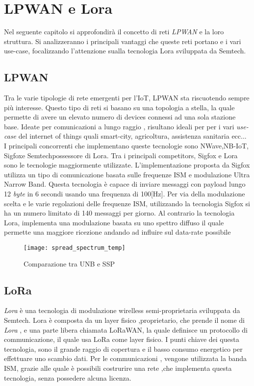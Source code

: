\chapter{LPWAN e Lora}
Nel seguente capitolo si approfondirà il concetto di reti \emph{LPWAN} e la loro 
struttura. Si analizzeranno i principali vantaggi che queste reti portano e i
vari use-case, focalizzando l'attenzione sualla tecnologia Lora sviluppata da
Semtech. 

\section{LPWAN}
Tra le varie tipologie di rete emergenti per l'IoT, LPWAN sta riscuotendo sempre
più interesse. Questo tipo di reti si basano su una topologia a stella, la quale
permette di avere un elevato numero di devices connessi ad una sola stazione
base. Ideate per comunicazioni a lungo raggio , risultano  ideali per 
per i vari \emph{use-case} del internet of things quali smart-city, agricoltura,
assistenza sanitaria ecc... 
I  principali concorrenti che implementano queste tecnologie sono
NWave,NB-IoT, Sigfox\tm e Semtech\tm possessore di Lora\tm. 
Tra i principali competitors, Sigfox e Lora sono le tecnologie maggiormente
utilizzate.  L'implementazione proposta da Sigfox utilizza un tipo di
comunicazione basata sulle frequenze ISM e modulazione Ultra Narrow Band.
Questa tecnologia è capace di inviare messaggi con payload lungo 12 \emph{byte} 
in 6 secondi usando una frequenza di 100[Hz]. Per via della modulazione scelta e le
varie regolazioni delle frequenze ISM, utilizzando la tecnologia Sigfox si ha un
numero limitato  di 140 messaggi per giorno.
Al contrario la tecnologia Lora, implementa una modulazione basata su uno
spettro diffuso il quale permette una maggiore ricezione andando ad influire sul
data-rate possibile

\begin{figure}[h]
\centering 
\texttt{[image: spread\_spectrum\_temp]}
\caption{Comparazione tra UNB e SSP}
\end{figure}

\section{LoRa}
\emph{Lora} è una tecnologia di modulazione wirelless semi-proprietaria 
sviluppata da Semtech. Lora è composta da un layer fisico ,proprietario, che
prende il nome di \emph{Lora}\cite{LoRaCss101}  , e una parte libera chiamata 
LoRaWAN\cite{LoRaWAN101}, la quale definisce un protocollo di communicazione, 
il quale usa LoRa come layer fisico. 
I punti chiave dei questa tecnologia, sono il grande raggio di copertura e il 
basso consumo energetico per effettuare uno scambio dati. 
Per le communicazioni , vengone utilizzata la banda ISM, grazie alle
quale è possibili costrurire una rete ,che implementa questa tecnologia, senza
possedere alcuna licenza.


